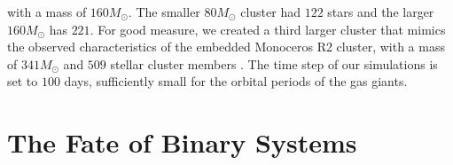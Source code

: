\documentclass{aastex631}
\begin{document}
with a mass of $160 M_{\odot}$. The smaller $80M_{\odot}$ cluster had $122$ stars and the larger $160 M_{\odot}$ has $221$. For good measure, we created a third larger cluster
that mimics the observed characteristics of the embedded Monoceros R2 cluster, with a mass of $341 M_{\odot}$ and $509$ stellar cluster members \citep{car97}. 
The time step of our simulations is set to $100$ days, sufficiently small for the orbital periods of the gas giants. 
\section{The Fate of Binary Systems}
\end{document}

